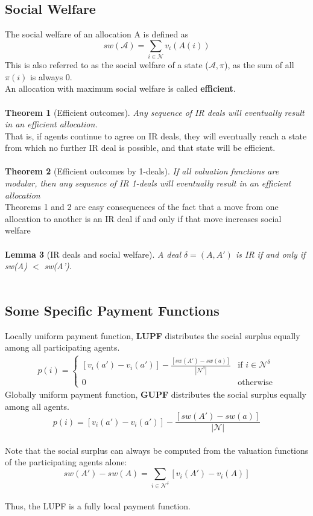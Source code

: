 \documentclass{article}
\begin{document}
\subsection{Social Welfare}
The social welfare of an allocation A is defined as $$sw(\mathcal{A})=\sum_{i \in \mathcal{N}}v_{i}(A(i))$$
This is also referred to as the social welfare of a state ($\mathcal{A}, \pi$), as the sum of all $\pi(i)$ is always 0.\\
An allocation with maximum social welfare is called \textbf{efficient}.\\
\\
\textbf{Theorem 1} (Efficient outcomes). \textit{Any sequence of IR deals will eventually result in an efficient allocation.}\\
That is, if agents continue to agree on IR deals, they will eventually reach a state from which no further
IR deal is possible, and that state will be efficient.\\
\\
\textbf{Theorem 2} (Efficient outcomes by 1-deals). \textit{If all valuation functions are modular, then any sequence of IR 1-deals will eventually result in an efficient allocation}\\
Theorems 1 and 2 are easy consequences of the fact that a move from one allocation to another is an IR
deal if and only if that move increases social welfare\\
\\
\textbf{Lemma 3} (IR deals and social welfare). \textit{A deal $\delta = (A, A')$ is IR if and only if sw(A) $<$ sw(A')}.\\
\\
\subsection{Some Specific Payment Functions}
Locally uniform payment function, \textbf{LUPF} distributes the social surplus equally among all participating agents.
\begin{align*}
    p(i) = \begin{cases}
             [v_{i}(a') - v_{i}(a')] - \frac{[sw(A') -sw(a)]}{|\mathcal{N}^{\delta}|}  & \text{if } i \in \mathcal{N}^{\delta} \\
             0  & \text{otherwise}
       \end{cases}
\end{align*}
Globally uniform payment function, \textbf{GUPF} distributes the social surplus equally among all agents.\\
$$ p(i) = [v_{i}(a') - v_{i}(a')] - \frac{[sw(A') -sw(a)]}{|\mathcal{N}|}$$
\\
Note that the social surplus can always be computed from the valuation functions of the participating agents alone:
$$ sw(A')-sw(A) = \sum_{i \in \mathcal{N}^\delta}[v_{i}(A') - v_{i}(A)]$$
\\
Thus, the LUPF is a fully local payment function.\\
\\
\end{document}
